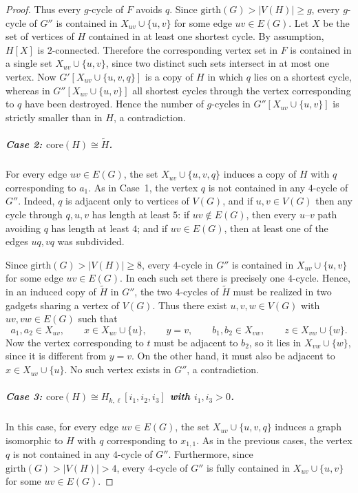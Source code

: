 \documentclass[a4paper,UKenglish,cleveref, autoref, thm-restate]{lipics-v2021}
\newcommand{\girth}{\mathrm{girth}}
\newcommand{\core}{\mathrm{core}}
\begin{document}
\begin{proof}
Thus every $g$-cycle of $F$ avoids $q$.
Since $\girth(G)>|V(H)|\geq g$, every $g$-cycle of $G''$ is contained in $X_{uv}\cup \{u,v\}$ for some edge $uv\in E(G)$.
Let $X$ be the set of vertices of $H$ contained in at least one shortest cycle.
By assumption, $H[X]$ is $2$-connected.
Therefore the corresponding vertex set in $F$ is contained in a single set $X_{uv}\cup \{u,v\}$, since two distinct such sets intersect in at most one vertex.
Now $G'[X_{uv}\cup \{u,v,q\}]$ is a copy of $H$ in which $q$ lies on a shortest cycle, whereas in $G''[X_{uv}\cup \{u,v\}]$ all shortest cycles through the vertex corresponding to $q$ have been destroyed.
Hence the number of $g$-cycles in $G''[X_{uv}\cup \{u,v\}]$ is strictly smaller than in $H$, a contradiction.

\subparagraph*{Case 2: \boldmath $\core(H)\cong \widetilde{H}$.}
For every edge $uv\in E(G)$, the set $X_{uv}\cup \{u,v,q\}$ induces a copy of $H$ with $q$ corresponding to $a_1$.
As in Case~1, the vertex $q$ is not contained in any $4$-cycle of $G''$.
Indeed, $q$ is adjacent only to vertices of $V(G)$, and if $u,v\in V(G)$ then any cycle through $q,u,v$ has length at least $5$: if $uv\notin E(G)$, then every $u$--$v$ path avoiding $q$ has length at least $4$; and if $uv\in E(G)$, then at least one of the edges $uq,vq$ was subdivided.

Since $\girth(G)>|V(H)|\geq 8$, every $4$-cycle in $G''$ is contained in $X_{uv}\cup \{u,v\}$ for some edge $uv\in E(G)$.
In each such set there is precisely one $4$-cycle.
Hence, in an induced copy of $\widetilde{H}$ in $G''$, the two $4$-cycles of $\widetilde{H}$ must be realized in two gadgets sharing a vertex of $V(G)$.
Thus there exist $u,v,w\in V(G)$ with $uv,vw\in E(G)$ such that
\[
a_1,a_2\in X_{uv},\qquad x\in X_{uv}\cup \{u\},\qquad y=v,\qquad
b_1,b_2\in X_{vw},\qquad z\in X_{vw}\cup \{w\}.
\]
Now the vertex corresponding to $t$ must be adjacent to $b_2$, so it lies in $X_{vw}\cup \{w\}$, since it is different from $y=v$.
On the other hand, it must also be adjacent to $x\in X_{uv}\cup \{u\}$.
No such vertex exists in $G''$, a contradiction.

\subparagraph*{Case 3: \boldmath $\core(H)\cong H_{k,\ell}[i_1,i_2,i_3]$ with $i_1,i_3>0$.}
In this case, for every edge $uv\in E(G)$, the set $X_{uv}\cup \{u,v,q\}$ induces a graph isomorphic to $H$ with $q$ corresponding to $x_{1,1}$.
As in the previous cases, the vertex $q$ is not contained in any $4$-cycle of $G''$.
Furthermore, since $\girth(G)>|V(H)|>4$, every $4$-cycle of $G''$ is fully contained in $X_{uv}\cup \{u,v\}$ for some $uv\in E(G)$.


\end{proof}
\end{document}
